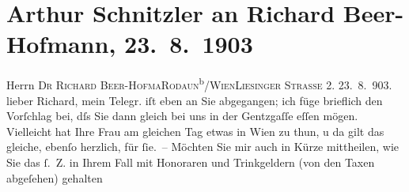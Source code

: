 

         
         \renewcommand{\erwaehntePersonen}{Personen: Richard Beer-Hofmann, Paula Beer-Hofmann, Louise Schnitzler, Olga Schnitzler}
         \renewcommand{\erwaehnteOrte}{Orte: Gentzgasse, IX., Alsergrund, Liesingerstraße, Meran, Palast Hotel Lido, Riva del Garda, Rodaun, Wien}
         \renewcommand{\erwaehnteWerke}{}
               \section[Arthur Schnitzler an Richard Beer-Hofmann, 23. 8. 1903]{ Arthur Schnitzler an Richard Beer-Hofmann, 23. 8. 1903}\nopagebreak{}\rehead{ }\begin{ledgroupsized}[t]{13cm}\normalsize\beginnumbering \toendnotes[C]{\smallbreak\pagebreak[2]} 
\toendnotes[C]{\smallbreak}\pstart{}{\pb}Herrn \textsc{Dr Richard }\pend{}\pstart{}\textsc{Beer-Hofma{\geminationn}}\pend{}\pstart{}\textsc{Rodaun}\textsuperscript{b}/\textsc{Wien}\pend{}\pstart{}\textsc{Liesinger Straße 2.}\pend{}{\bigskip}\pstart
           \raggedleft{}{\pb}23. 8. 903. \pend
           \pstart
           lieber Richard, mein Telegr. iſt eben an Sie abgegangen; ich füge
               brieflich den Vorſchlag bei, dſs Sie dann gleich bei uns in der Gentzgaſſe eſſen mögen. Vielleicht hat Ihre Frau am gleichen Tag etwas in Wien zu thun, u da{\geminationn} gilt das
               gleiche, ebenſo herzlich, für ſie. –\pend
           \pstart
           Möchten Sie mir auch in Kürze mittheilen, wie {\pb}Sie das
               ſ. Z. in Ihrem Fall mit Honoraren und Trinkgeldern (von den Taxen abgeſehen) gehalten

\end{ledgroupsized}
